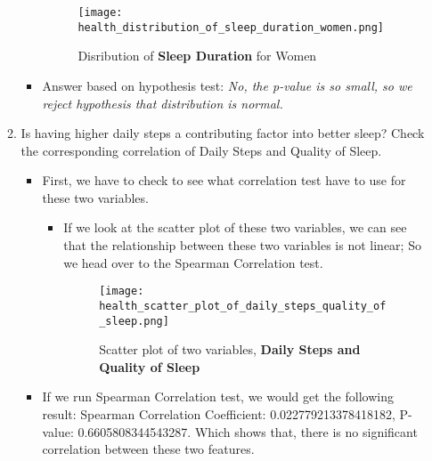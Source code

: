\documentclass{article}
\begin{document}
\begin{enumerate}
\begin{enumerate}[label=(\alph*)]
\begin{itemize}
\begin{figure}[H]
                \centering
                \texttt{[image: health\_distribution\_of\_sleep\_duration\_women.png]}  %
                \caption{Disribution of \textbf{Sleep Duration} for Women}
                \label{fig:Figure_3}  %
    
            \end{figure}
            
            \item Answer based on hypothesis test:
            \textit{No, the p-value is so small, so we reject hypothesis that distribution is normal.}

        \end{itemize}

        \item Is having higher daily steps a contributing factor into better sleep? Check the corresponding correlation of Daily Steps and Quality of Sleep.
        \begin{itemize}
            \item First, we have to check to see what correlation test have to use for these two variables.
            \begin{itemize}
                \item If we look at the scatter plot of these two variables, we can see that the relationship between these two variables is not linear; So we head over to the Spearman Correlation test.
                \begin{figure}[H]  %

                    \centering
                    \texttt{[image: health\_scatter\_plot\_of\_daily\_steps\_quality\_of\_sleep.png]}  %
                    \caption{Scatter plot of two variables, \textbf{Daily Steps and Quality of Sleep}}
                    \label{fig:Figure_4}  %
        
                \end{figure}
            \end{itemize}

            \item If we run Spearman Correlation test, we would get the following result: Spearman Correlation Coefficient: 0.022779213378418182, P-value: 0.6605808344543287. Which shows that, there is no significant correlation between these two features. 
        \end{itemize}


\end{enumerate}
\end{enumerate}
\end{document}
